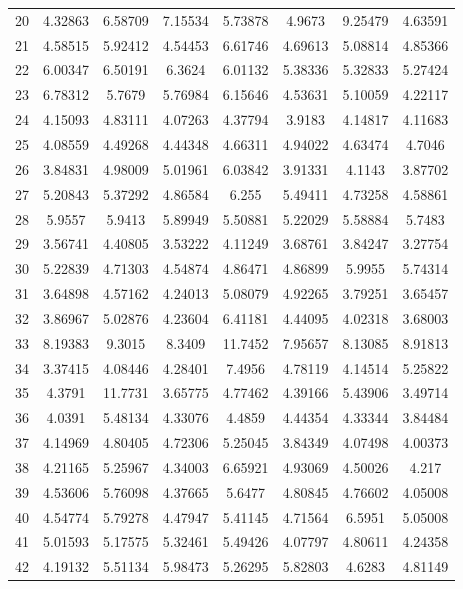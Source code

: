\begin{center}
\begin{longtable}{cccccccc}
20 & 4.32863 & 6.58709 & 7.15534 & 5.73878 & 4.9673 & 9.25479 & 4.63591\\
21 & 4.58515 & 5.92412 & 4.54453 & 6.61746 & 4.69613 & 5.08814 & 4.85366\\
22 & 6.00347 & 6.50191 & 6.3624 & 6.01132 & 5.38336 & 5.32833 & 5.27424\\
23 & 6.78312 & 5.7679 & 5.76984 & 6.15646 & 4.53631 & 5.10059 & 4.22117\\
24 & 4.15093 & 4.83111 & 4.07263 & 4.37794 & 3.9183 & 4.14817 & 4.11683\\
25 & 4.08559 & 4.49268 & 4.44348 & 4.66311 & 4.94022 & 4.63474 & 4.7046\\
26 & 3.84831 & 4.98009 & 5.01961 & 6.03842 & 3.91331 & 4.1143 & 3.87702\\
27 & 5.20843 & 5.37292 & 4.86584 & 6.255 & 5.49411 & 4.73258 & 4.58861\\
28 & 5.9557 & 5.9413 & 5.89949 & 5.50881 & 5.22029 & 5.58884 & 5.7483\\
29 & 3.56741 & 4.40805 & 3.53222 & 4.11249 & 3.68761 & 3.84247 & 3.27754\\
30 & 5.22839 & 4.71303 & 4.54874 & 4.86471 & 4.86899 & 5.9955 & 5.74314\\
31 & 3.64898 & 4.57162 & 4.24013 & 5.08079 & 4.92265 & 3.79251 & 3.65457\\
32 & 3.86967 & 5.02876 & 4.23604 & 6.41181 & 4.44095 & 4.02318 & 3.68003\\
33 & 8.19383 & 9.3015 & 8.3409 & 11.7452 & 7.95657 & 8.13085 & 8.91813\\
34 & 3.37415 & 4.08446 & 4.28401 & 7.4956 & 4.78119 & 4.14514 & 5.25822\\
35 & 4.3791 & 11.7731 & 3.65775 & 4.77462 & 4.39166 & 5.43906 & 3.49714\\
36 & 4.0391 & 5.48134 & 4.33076 & 4.4859 & 4.44354 & 4.33344 & 3.84484\\
37 & 4.14969 & 4.80405 & 4.72306 & 5.25045 & 3.84349 & 4.07498 & 4.00373\\
38 & 4.21165 & 5.25967 & 4.34003 & 6.65921 & 4.93069 & 4.50026 & 4.217\\
39 & 4.53606 & 5.76098 & 4.37665 & 5.6477 & 4.80845 & 4.76602 & 4.05008\\
40 & 4.54774 & 5.79278 & 4.47947 & 5.41145 & 4.71564 & 6.5951 & 5.05008\\
41 & 5.01593 & 5.17575 & 5.32461 & 5.49426 & 4.07797 & 4.80611 & 4.24358\\
42 & 4.19132 & 5.51134 & 5.98473 & 5.26295 & 5.82803 & 4.6283 & 4.81149\\

\end{longtable}
\end{center}
